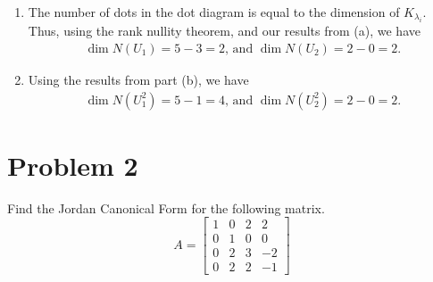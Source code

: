 \documentclass[10pt,a4paper]{article}
\theoremstyle{definition}
\begin{document}
\begin{enumerate}
\begin{enumerate}
\item The number of dots in the dot diagram is equal to the dimension of $K_{\lambda_i}$. Thus, using the rank nullity theorem, and our results from (a), we have
\begin{align*}
\dim N(U_1) = 5 - 3 = 2 \text{, and } \dim N(U_2) = 2 - 0 = 2.
\end{align*}

\item Using the results from part (b), we have
\begin{align*}
\dim N(U_1^2) = 5 - 1 = 4 \text{, and } \dim N(U_2^2) = 2 - 0 = 2.
\end{align*}
\end{enumerate}
\end{enumerate}

\section*{Problem 2}
Find the Jordan Canonical Form for the following matrix.
\[A = \begin{bmatrix}
1 &0 &2 &2\\
0 &1 &0 &0\\
0 &2 &3 &-2\\
0 &2 &2 &-1
\end{bmatrix}\]
\end{document}
